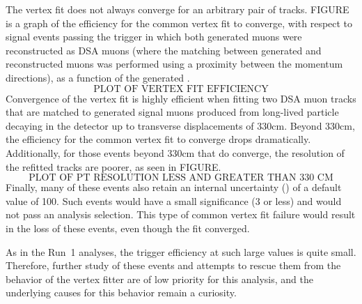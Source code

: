The vertex fit does not always converge for an arbitrary pair of tracks.
FIGURE is a graph of the efficiency for the common vertex fit to converge, with respect to signal events passing the trigger in which both generated muons were reconstructed as DSA muons (where the matching between generated and reconstructed muons was performed using a \deltaR proximity between the momentum directions), as a function of the generated \Lxy.
$$\text{PLOT OF VERTEX FIT EFFICIENCY}$$
Convergence of the vertex fit is highly efficient when fitting two DSA muon tracks that are matched to generated signal muons produced from long-lived particle decaying in the detector up to transverse displacements of 330\unit{cm}.
Beyond 330\unit{cm}, the efficiency for the common vertex fit to converge drops dramatically.
Additionally, for those events beyond 330\unit{cm} that do converge, the \pT resolution of the refitted tracks are poorer, as seen in FIGURE.
$$\text{PLOT OF PT RESOLUTION LESS AND GREATER THAN 330 CM}$$
Finally, many of these events also retain an internal \Lxy uncertainty (\LxyErr) of a default value of 100\cm.
Such events would have a small \Lxy significance (3 or less) and would not pass an analysis selection.
This type of common vertex fit failure would result in the loss of these events, even though the fit converged.

As in the Run~1 analyses, the trigger efficiency at such large \Lxy values is quite small.
Therefore, further study of these events and attempts to rescue them from the behavior of the vertex fitter are of low priority for this analysis, and the underlying causes for this behavior remain a curiosity.

